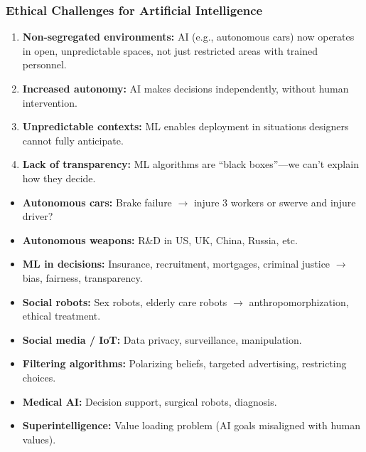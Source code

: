 \bigseparator

\subsubsection{Ethical Challenges for Artificial Intelligence}

\begin{keybox}
\begin{enumerate}
  \item \textbf{Non-segregated environments:} AI (e.g., autonomous cars) now operates in open, unpredictable spaces, not just restricted areas with trained personnel.
  \item \textbf{Increased autonomy:} AI makes decisions independently, without human intervention.
  \item \textbf{Unpredictable contexts:} ML enables deployment in situations designers cannot fully anticipate.
  \item \textbf{Lack of transparency:} ML algorithms are ``black boxes''---we can't explain how they decide.
\end{enumerate}
\end{keybox}

\begin{exbox}
\begin{itemize}
  \item \textbf{Autonomous cars:} Brake failure $\to$ injure 3 workers or swerve and injure driver?
  \item \textbf{Autonomous weapons:} R\&D in US, UK, China, Russia, etc.
  \item \textbf{ML in decisions:} Insurance, recruitment, mortgages, criminal justice $\to$ bias, fairness, transparency.
  \item \textbf{Social robots:} Sex robots, elderly care robots $\to$ anthropomorphization, ethical treatment.
  \item \textbf{Social media / IoT:} Data privacy, surveillance, manipulation.
  \item \textbf{Filtering algorithms:} Polarizing beliefs, targeted advertising, restricting choices.
  \item \textbf{Medical AI:} Decision support, surgical robots, diagnosis.
  \item \textbf{Superintelligence:} Value loading problem (AI goals misaligned with human values).
\end{itemize}
\end{exbox}

